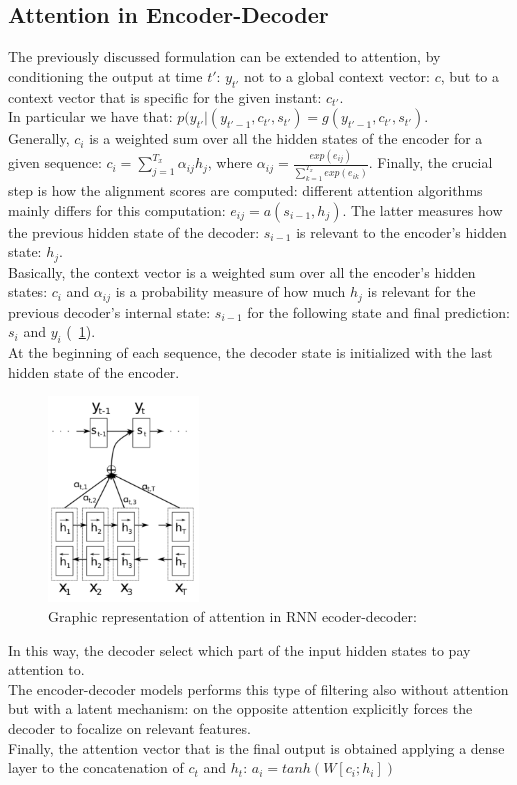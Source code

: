 \documentclass[LaM,binding=0.6cm]{sapthesis}
\begin{document}
\subsection{Attention in Encoder-Decoder}
The previously discussed formulation can be extended to attention, by conditioning the output at time $t'$: $y_{t'}$ not to a global context vector: $c$, but to a context vector that is specific for the given instant: $c_{t'}$.\\In particular we have that: $p(y_{t'}|(y_{t'-1},c_{t'},s_{t'})=g(y_{t'-1},c_{t'},s_{t'})$.\\Generally, $c_{i}$ is a weighted sum over all the hidden states of the encoder for a given sequence: $c_{i} = \sum_{j=1}^{T_x}\alpha_{ij}h_j$, where $\alpha_{ij}=\frac{exp(e_{ij})}{\sum_{k=1}^{T_x}exp(e_{ik})}$. Finally, the crucial step is how the alignment scores are computed: different attention algorithms mainly differs for this computation: $e_{ij}=a(s_{i-1},h_j)$. The latter measures how the previous hidden state of the decoder: $s_{i-1}$ is relevant to the encoder's hidden state: $h_j$.\\Basically, the context vector is a weighted sum over all the encoder's hidden states: $c_{i}$ and $\alpha_{ij}$ is a probability measure of how much $h_j$ is relevant for the previous decoder's internal state: $s_{i-1}$ for the following state and final prediction: $s_i$ and $y_i$ (~\ref{fig:encdecatt}).\\At the beginning of each sequence, the decoder state is initialized with the last hidden state of the encoder.
\begin{figure}[H]  \centering
    \includegraphics[width=40mm,scale=0.5]{encdecatt}
    \caption{Graphic representation of attention in RNN ecoder-decoder: \cite{psy}}
    \label{fig:encdecatt}
\end{figure}
In this way, the decoder select which part of the input hidden states to pay attention to.\\The encoder-decoder models performs this type of filtering also without attention but with a latent mechanism: on the opposite attention explicitly forces the decoder to focalize on relevant features.\\Finally, the attention vector that is the final output is obtained applying a dense layer to the concatenation of $c_t$ and $h_t$: $a_i=tanh(W[c_i;h_i])$
\end{document}
